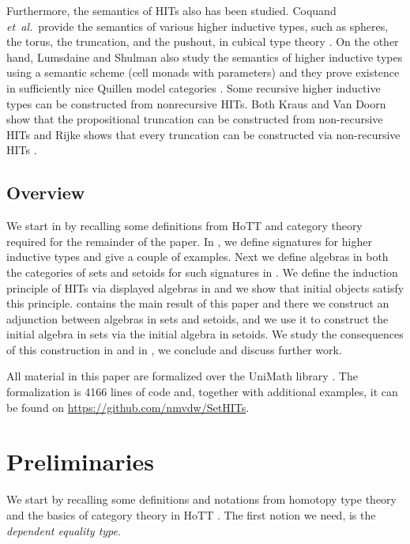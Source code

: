 \documentclass[9pt]{entcs}
\newcommand{\etal}{\emph{et~al.}}
\newcommand{\0}{\textbf{0}} %
\begin{document}
Furthermore, the semantics of HITs also has been studied.
Coquand \etal \ provide the semantics of various higher inductive types, such as spheres, the torus, the truncation, and the pushout, in cubical type theory \cite{BezemCH13,CohenCHM16,CoquandHM18}.
On the other hand, Lumsdaine and Shulman also study the semantics of higher inductive types using a semantic scheme (cell monads with parameters) and they prove existence in sufficiently nice Quillen model categories \cite{lumsdaine2017semantics}.
Some recursive higher inductive types can be constructed from nonrecursive HITs.
Both Kraus and Van Doorn show that the propositional truncation can be constructed from non-recursive HITs \cite{Kraus16,Doorn16} and Rijke shows that every truncation can be constructed via non-recursive HITs \cite{rijke2017join}.

\subsection{Overview}
We start in  by recalling some definitions from HoTT and category theory required for the remainder of the paper.
In , we define signatures for higher inductive types and give a couple of examples.
Next we define algebras in both the categories of sets and setoids for such signatures in .
We define the induction principle of HITs via displayed algebras in  and we show that initial objects satisfy this principle.
 contains the main result of this paper and there we construct an adjunction between algebras in sets and setoids, and we use it to construct the initial algebra in sets via the initial algebra in setoids.
We study the consequences of this construction in  and in , we conclude and discuss further work.

All material in this paper are formalized over the UniMath library \cite{UniMath}.
The formalization is 4166 lines of code and, together with additional examples, it can be found on \url{https://github.com/nmvdw/SetHITs}.

\section{Preliminaries}
\label{sec:prelim}
We start by recalling some definitions and notations from homotopy type theory and the basics of category theory in HoTT \cite{AhrensKS15,mac2013categories,hottbook}.
The first notion we need, is the \emph{dependent equality type}.
\end{document}
